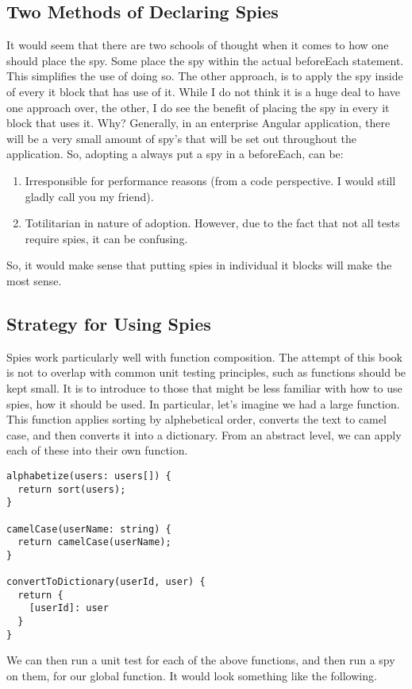 \subsection{ Two Methods of Declaring Spies }
It would seem that there are two schools of thought when it comes to how one should
place the spy. Some place the spy within the actual beforeEach statement. This
simplifies the use of doing so. The other approach, is to apply the spy inside of
every it block that has use of it. While I do not think it is a huge deal to have
one approach over, the other, I do see the benefit of placing the spy in every
it block that uses it. Why? Generally, in an enterprise Angular application,
there will be a very small amount of spy's that will be set out throughout the
application. So, adopting a always put a spy in a beforeEach, can be:
\begin{enumerate}
  \item Irresponsible for performance reasons (from a code perspective. I would still gladly call you my friend).
  \item Totilitarian in nature of adoption. However, due to the fact that not
  all tests require spies, it can be confusing.
\end{enumerate}

So, it would make sense that putting spies in individual it blocks will make the
most sense.

\subsection{ Strategy for Using Spies }
Spies work particularly well with function composition. The attempt of this book
is not to overlap with common unit testing principles, such as functions should
be kept small. It is to introduce to those that might be less familiar with how
to use spies, how it should be used. In particular, let's imagine we had a large
function. This function applies sorting by alphebetical order, converts the text
to camel case, and then converts it into a dictionary. From an abstract level,
we can apply each of these into their own function.

\begin{lstlisting}
alphabetize(users: users[]) {
  return sort(users);
}

camelCase(userName: string) {
  return camelCase(userName);
}

convertToDictionary(userId, user) {
  return {
    [userId]: user
  }
}
\end{lstlisting}

We can then run a unit test for each of the above functions, and then run a spy
on them, for our global function. It would look something like the following. 
